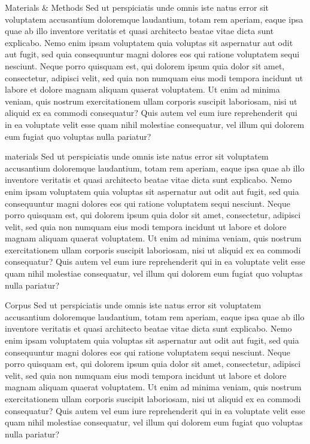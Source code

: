 \documentclass{article}
\begin{document}
		
	\begin{mychapter}{Materials \& Methods}
		Sed ut perspiciatis unde omnis iste natus error sit voluptatem accusantium doloremque laudantium, totam rem aperiam, eaque ipsa quae ab illo inventore veritatis et quasi architecto beatae vitae dicta sunt explicabo. Nemo enim ipsam voluptatem quia voluptas sit aspernatur aut odit aut fugit, sed quia consequuntur magni dolores eos qui ratione voluptatem sequi nesciunt. Neque porro quisquam est, qui dolorem ipsum quia dolor sit amet, consectetur, adipisci velit, sed quia non numquam eius modi tempora incidunt ut labore et dolore magnam aliquam quaerat voluptatem. Ut enim ad minima veniam, quis nostrum exercitationem ullam corporis suscipit laboriosam, nisi ut aliquid ex ea commodi consequatur? Quis autem vel eum iure reprehenderit qui in ea voluptate velit esse quam nihil molestiae consequatur, vel illum qui dolorem eum fugiat quo voluptas nulla pariatur?
	\begin{mysection}{materials}
		Sed ut perspiciatis unde omnis iste natus error sit voluptatem accusantium doloremque laudantium, totam rem aperiam, eaque ipsa quae ab illo inventore veritatis et quasi architecto beatae vitae dicta sunt explicabo. Nemo enim ipsam voluptatem quia voluptas sit aspernatur aut odit aut fugit, sed quia consequuntur magni dolores eos qui ratione voluptatem sequi nesciunt. Neque porro quisquam est, qui dolorem ipsum quia dolor sit amet, consectetur, adipisci velit, sed quia non numquam eius modi tempora incidunt ut labore et dolore magnam aliquam quaerat voluptatem. Ut enim ad minima veniam, quis nostrum exercitationem ullam corporis suscipit laboriosam, nisi ut aliquid ex ea commodi consequatur? Quis autem vel eum iure reprehenderit qui in ea voluptate velit esse quam nihil molestiae consequatur, vel illum qui dolorem eum fugiat quo voluptas nulla pariatur?
	\begin{mysubsection}{Corpus}
		Sed ut perspiciatis unde omnis iste natus error sit voluptatem accusantium doloremque laudantium, totam rem aperiam, eaque ipsa quae ab illo inventore veritatis et quasi architecto beatae vitae dicta sunt explicabo. Nemo enim ipsam voluptatem quia voluptas sit aspernatur aut odit aut fugit, sed quia consequuntur magni dolores eos qui ratione voluptatem sequi nesciunt. Neque porro quisquam est, qui dolorem ipsum quia dolor sit amet, consectetur, adipisci velit, sed quia non numquam eius modi tempora incidunt ut labore et dolore magnam aliquam quaerat voluptatem. Ut enim ad minima veniam, quis nostrum exercitationem ullam corporis suscipit laboriosam, nisi ut aliquid ex ea commodi consequatur? Quis autem vel eum iure reprehenderit qui in ea voluptate velit esse quam nihil molestiae consequatur, vel illum qui dolorem eum fugiat quo voluptas nulla pariatur?

\end{mysubsection}
\end{mysection}
\end{mychapter}
\end{document}
